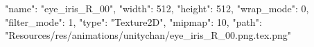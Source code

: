 {
  "name": "eye_iris_R_00",
  "width": 512,
  "height": 512,
  "wrap_mode": 0,
  "filter_mode": 1,
  "type": "Texture2D",
  "mipmap": 10,
  "path": "Resources/res/animations/unitychan/eye_iris_R_00.png.tex.png"
}